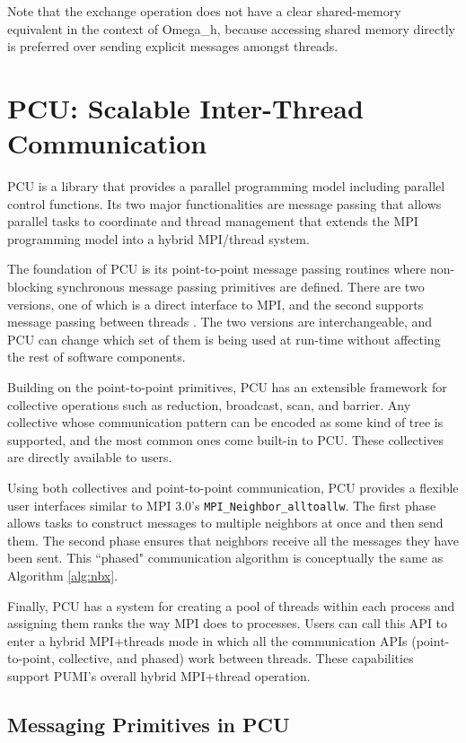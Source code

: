 Note that the exchange operation does not have a clear shared-memory equivalent
in the context of Omega\_h,
because accessing shared memory directly is preferred over sending
explicit messages amongst threads.

\section{PCU: Scalable Inter-Thread Communication}
\label{sec:pcu}

PCU is a library that provides a parallel programming model including
parallel control functions.
Its two major functionalities are message passing that allows parallel tasks to
coordinate and thread management that extends the MPI programming model
into a hybrid MPI/thread system.

The foundation of PCU is its point-to-point message passing routines where
non-blocking synchronous message passing primitives are defined. There are
two versions, one of which is a direct interface to MPI, and the second supports
message passing between threads \cite{ibanez2016hybrid}. The two versions
are interchangeable, and PCU can change which set of them is being used at
run-time without affecting the rest of software components.

Building on the point-to-point primitives, PCU has an extensible framework for
collective operations such as reduction, broadcast, scan, and barrier.
Any collective whose communication pattern can be encoded as some kind of tree
is supported, and the most common ones come built-in to PCU.
These collectives are directly available to users.

Using both collectives and point-to-point communication, PCU provides a flexible
user interfaces similar to MPI 3.0's \texttt{MPI\_Neighbor\_alltoallw}.
The first phase
allows tasks to construct messages to multiple neighbors
at once and then send them.
The second phase ensures that neighbors
receive all the messages they have been sent.
This ``phased" communication algorithm is
conceptually the same as Algorithm \ref{alg:nbx}.

Finally, PCU has a system for creating a pool of threads within each process and
assigning them ranks the way MPI does to processes.
Users can call this API to enter a hybrid MPI+threads mode in which all the
communication APIs (point-to-point, collective, and phased) work between
threads.
These capabilities support PUMI's overall hybrid MPI+thread operation.

\subsection{Messaging Primitives in PCU}
\label{sec:pcu_p2p}

